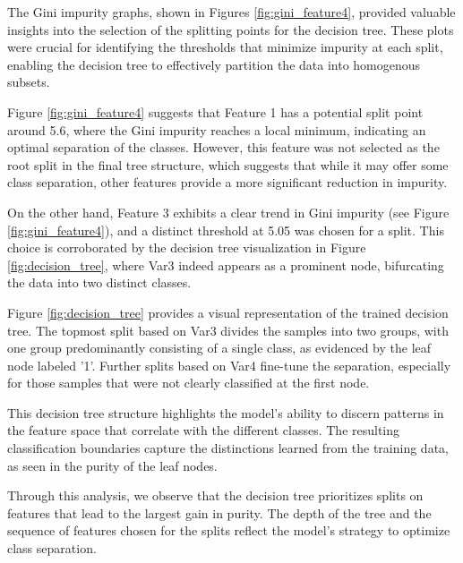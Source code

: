 \documentclass[12pt, onecolumn]{article}
\begin{document}
The Gini impurity graphs, shown in Figures \ref{fig:gini_feature4}, provided valuable insights into the selection of the splitting points for the decision tree. These plots were crucial for identifying the thresholds that minimize impurity at each split, enabling the decision tree to effectively partition the data into homogenous subsets.

Figure \ref{fig:gini_feature4} suggests that Feature 1 has a potential split point around 5.6, where the Gini impurity reaches a local minimum, indicating an optimal separation of the classes. However, this feature was not selected as the root split in the final tree structure, which suggests that while it may offer some class separation, other features provide a more significant reduction in impurity.

On the other hand, Feature 3 exhibits a clear trend in Gini impurity (see Figure \ref{fig:gini_feature4}), and a distinct threshold at 5.05 was chosen for a split. This choice is corroborated by the decision tree visualization in Figure \ref{fig:decision_tree}, where Var3 indeed appears as a prominent node, bifurcating the data into two distinct classes.

Figure \ref{fig:decision_tree} provides a visual representation of the trained decision tree. The topmost split based on Var3 divides the samples into two groups, with one group predominantly consisting of a single class, as evidenced by the leaf node labeled '1'. Further splits based on Var4 fine-tune the separation, especially for those samples that were not clearly classified at the first node.

This decision tree structure highlights the model's ability to discern patterns in the feature space that correlate with the different classes. The resulting classification boundaries capture the distinctions learned from the training data, as seen in the purity of the leaf nodes.

Through this analysis, we observe that the decision tree prioritizes splits on features that lead to the largest gain in purity. The depth of the tree and the sequence of features chosen for the splits reflect the model's strategy to optimize class separation.
\end{document}
